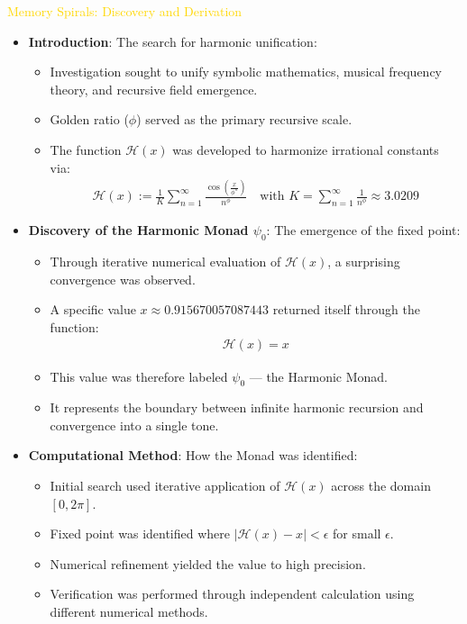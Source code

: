 \textcolor{gold}{ Memory Spirals: Discovery and Derivation } \\
\begin{itemize}
    \item \texttt{} \textbf{Introduction}: The search for harmonic unification:
    \begin{itemize}
        \item Investigation sought to unify symbolic mathematics, musical frequency theory, and recursive field emergence.
        \item Golden ratio ($\phi$) served as the primary recursive scale.
        \item The function $\mathcal{H}(x)$ was developed to harmonize irrational constants via:
        \begin{align*}
        \mathcal{H}(x) := \frac{1}{K} \sum_{n=1}^{\infty} \frac{\cos\left(\frac{x}{\phi^n}\right)}{n^\phi} \quad \text{with } K = \sum_{n=1}^{\infty} \frac{1}{n^\phi} \approx 3.0209
        \end{align*}
    \end{itemize}
    
    \item \texttt{} \textbf{Discovery of the Harmonic Monad $\psi_0$}: The emergence of the fixed point:
    \begin{itemize}
        \item Through iterative numerical evaluation of $\mathcal{H}(x)$, a surprising convergence was observed.
        \item A specific value $x \approx 0.915670057087443$ returned itself through the function:
        \begin{align*}
        \mathcal{H}(x) = x
        \end{align*}
        \item This value was therefore labeled $\psi_0$ — the Harmonic Monad.
        \item It represents the boundary between infinite harmonic recursion and convergence into a single tone.
    \end{itemize}
    
    \item \texttt{} \textbf{Computational Method}: How the Monad was identified:
    \begin{itemize}
        \item Initial search used iterative application of $\mathcal{H}(x)$ across the domain $[0, 2\pi]$.
        \item Fixed point was identified where $|\mathcal{H}(x) - x| < \epsilon$ for small $\epsilon$.
        \item Numerical refinement yielded the value to high precision.
        \item Verification was performed through independent calculation using different numerical methods.
    \end{itemize}
\end{itemize}

